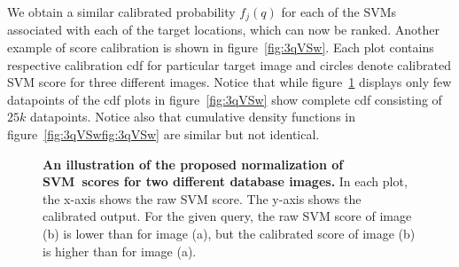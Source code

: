       We obtain a similar calibrated probability $f_j(q)$ for each of the SVMs associated with each of the target locations, which can now be ranked.
      \textcolor{petr}{
      Another example of score calibration is shown in figure~\ref{fig:3qVSw}. Each plot contains respective calibration cdf for particular target image and circles denote calibrated SVM score for three different images. Notice that while figure~\ref{fig:calib} displays only few datapoints of the cdf plots in figure~\ref{fig:3qVSw} show complete cdf consisting of $25k$ datapoints. Notice also that cumulative density functions in figure~\ref{fig:3qVSwfig:3qVSw} are similar but not identical.
      }
      \begin{figure}[t]
         \vspace{1mm}
         \vspace{1.5mm}\newline
         \vspace*{-3mm}
         \caption[]{
            \textbf{An illustration of the proposed normalization of SVM~scores for two different database images.}
            In each plot, the x-axis shows the raw SVM score. The y-axis shows the calibrated output. For the given query, the raw SVM score of image (b) is lower than for image (a), but the calibrated score of image (b) is higher than for image (a). 
         }
         \vspace*{-2mm}
         \label{fig:calib}
      \end{figure}

